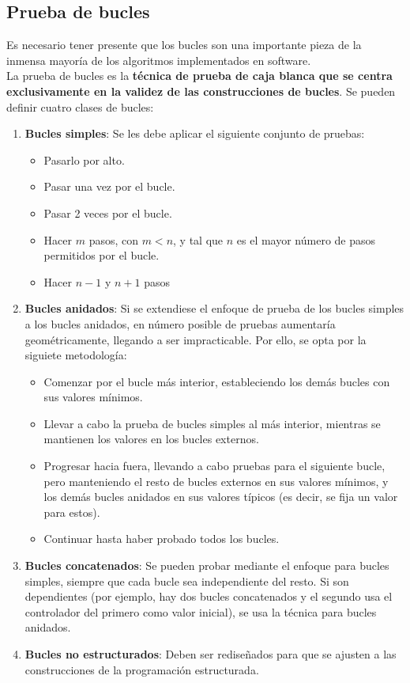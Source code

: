 \subsection{Prueba de bucles}

Es necesario tener presente que los bucles son una importante pieza de la inmensa mayoría de los algoritmos implementados en software.\\

La prueba de bucles es la \textbf{técnica de prueba de caja blanca que se centra exclusivamente en la validez de las construcciones de bucles}. Se pueden definir cuatro clases de bucles:

\begin{enumerate}
    \item \textbf{Bucles simples}: Se les debe aplicar el siguiente conjunto de pruebas:
          \begin{itemize}
              \item Pasarlo por alto.
              \item Pasar una vez por el bucle.
              \item Pasar 2 veces por el bucle.
              \item Hacer $m$ pasos, con $m < n$, y tal que $n$ es el mayor número de pasos permitidos por el bucle.
              \item Hacer $n-1$ y $n+1$ pasos
          \end{itemize}

    \item \textbf{Bucles anidados}: Si se extendiese el enfoque de prueba de los bucles simples a los bucles anidados, en número posible de pruebas aumentaría geométricamente, llegando a ser impracticable. Por ello, se opta por la siguiete metodología:
          \begin{itemize}
              \item Comenzar por el bucle más interior, estableciendo los demás bucles con sus valores mínimos.
              \item Llevar a cabo la prueba de bucles simples al más interior, mientras se mantienen los valores en los bucles externos.
              \item Progresar hacia fuera, llevando a cabo pruebas para el siguiente bucle, pero manteniendo el resto de bucles externos en sus valores mínimos, y los demás bucles anidados en sus valores típicos (es decir, se fija un valor para estos).
              \item Continuar hasta haber probado todos los bucles.
          \end{itemize}
    \item \textbf{Bucles concatenados}: Se pueden probar mediante el enfoque para bucles simples, siempre que cada bucle sea independiente del resto. Si son dependientes (por ejemplo, hay dos bucles concatenados y el segundo usa el controlador del primero como valor inicial), se usa la técnica para bucles anidados.
    \item \textbf{Bucles no estructurados}: Deben ser rediseñados para que se ajusten a las construcciones de la programación estructurada.
\end{enumerate}

